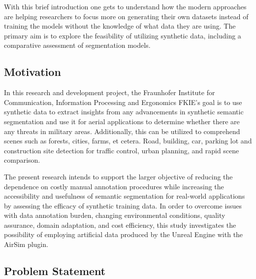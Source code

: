 \documentclass[../report.tex]{subfiles}
\begin{document}
    With this brief introduction one gets to understand how the modern approaches are helping researchers to focus more on generating their own datasets instead of training the models without the knowledge of what data they are using. The primary aim is to explore the feasibility of utilizing synthetic data, including a comparative assessment of segmentation models.

    \subsection{Motivation}
    \label{sec:introduction:motivation}

    In this research and development project, the Fraunhofer Institute for Communication, Information Processing and Ergonomics FKIE's goal is to use synthetic data to extract insights from any advancements in synthetic semantic segmentation and use it for aerial applications to determine whether there are any threats in military areas. Additionally, this can be utilized to comprehend scenes such as forests, cities, farms, et cetera. Road, building, car, parking lot and construction site detection for traffic control, urban planning, and rapid scene comparison.
    
    
    
    The present research intends to support the larger objective of reducing the dependence on costly manual annotation procedures while increasing the accessibility and usefulness of semantic segmentation for real-world applications by assessing the efficacy of synthetic training data. In order to overcome issues with data annotation burden, changing environmental conditions, quality assurance, domain adaptation, and cost efficiency, this study investigates the possibility of employing artificial data produced by the Unreal Engine with the AirSim plugin.  
    

    \subsection{Problem Statement}
    \label{sec:introduction:problem_statement}
\end{document}
